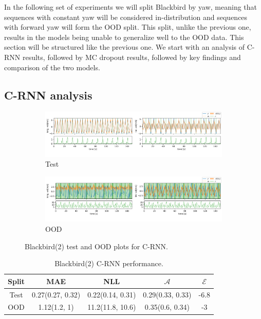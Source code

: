 
In the following set of experiments we will split Blackbird by yaw, meaning that sequences with constant yaw will be considered in-distribution and sequences with forward yaw will form the OOD split. This split, unlike the previous one, results in the models being unable to generalize well to the OOD data. This section will be structured like the previous one. We start with an analysis of C-RNN results, followed by MC dropout results, followed by key findings and comparison of the two models.

\subsection{C-RNN analysis}

\begin{figure}[h]
  \centering
  
  \begin{subfigure}[b]{\textwidth}
    \includegraphics[width=\textwidth]{Experiments/figs/bb2_test.png}
    \caption{Test}
  \end{subfigure}
  
  \begin{subfigure}[b]{\textwidth}
    \includegraphics[width=\textwidth]{Experiments/figs/bb2_ood.png}
    \caption{OOD}
  \end{subfigure}
  
  \caption{Blackbird(2) test and OOD plots for C-RNN.}
  \label{fig:bb2_run}
\end{figure}

\begin{table}[h]
\centering
    \begin{tabular}{c  c  c   c  c }  
        \toprule
        Split & MAE & NLL & $\mathcal{A}$ & $\mathcal{E}$\\
        \midrule
        Test & 0.27(0.27, 0.32) & 0.22(0.14, 0.31) & 0.29(0.33, 0.33) &  -6.8\\
        OOD  &  1.12(1.2, 1) &  11.2(11.8, 10.6) & 0.35(0.6, 0.34)&  -3\\
        \midrule
    \end{tabular}
    \caption{Blackbird(2) C-RNN performance.}
    \label{tbl:bb2_CRNN}
\end{table}


